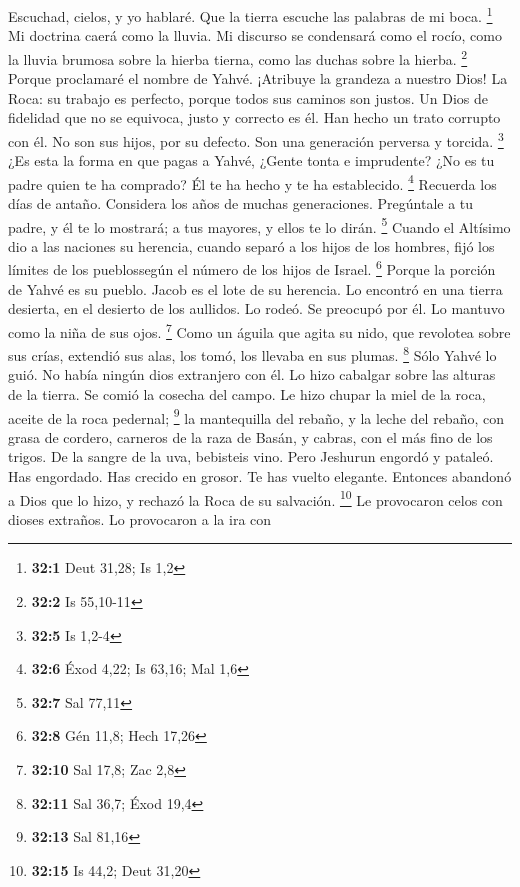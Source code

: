 \begin{paracol}{2}
 Escuchad, cielos, y yo hablaré. Que la tierra escuche las
palabras de mi boca. \footnote{\textbf{32:1} Deut 31,28; Is 1,2}
 Mi doctrina caerá como la lluvia. Mi discurso se
condensará como el rocío, como la lluvia brumosa sobre la hierba tierna,
como las duchas sobre la hierba. \footnote{\textbf{32:2} Is 55,10-11}
 Porque proclamaré el nombre de Yahvé. ¡Atribuye la
grandeza a nuestro Dios!  La Roca: su trabajo es perfecto,
porque todos sus caminos son justos. Un Dios de fidelidad que no se
equivoca, justo y correcto es él.  Han hecho un trato
corrupto con él. No son sus hijos, por su defecto. Son una generación
perversa y torcida. \footnote{\textbf{32:5} Is 1,2-4}  ¿Es
esta la forma en que pagas a Yahvé, ¿Gente tonta e imprudente? ¿No es tu
padre quien te ha comprado? Él te ha hecho y te ha establecido.
\footnote{\textbf{32:6} Éxod 4,22; Is 63,16; Mal 1,6} 
Recuerda los días de antaño. Considera los años de muchas generaciones.
Pregúntale a tu padre, y él te lo mostrará; a tus mayores, y ellos te lo
dirán. \footnote{\textbf{32:7} Sal 77,11}  Cuando el
Altísimo dio a las naciones su herencia, cuando separó a los hijos de
los hombres, fijó los límites de los pueblossegún el número de los hijos
de Israel. \footnote{\textbf{32:8} Gén 11,8; Hech 17,26} 
Porque la porción de Yahvé es su pueblo. Jacob es el lote de su
herencia.  Lo encontró en una tierra desierta, en el
desierto de los aullidos. Lo rodeó. Se preocupó por él. Lo mantuvo como
la niña de sus ojos. \footnote{\textbf{32:10} Sal 17,8; Zac 2,8}
 Como un águila que agita su nido, que revolotea sobre
sus crías, extendió sus alas, los tomó, los llevaba en sus plumas.
\footnote{\textbf{32:11} Sal 36,7; Éxod 19,4}  Sólo Yahvé
lo guió. No había ningún dios extranjero con él.  Lo hizo
cabalgar sobre las alturas de la tierra. Se comió la cosecha del campo.
Le hizo chupar la miel de la roca, aceite de la roca pedernal;
\footnote{\textbf{32:13} Sal 81,16}  la mantequilla del
rebaño, y la leche del rebaño, con grasa de cordero, carneros de la raza
de Basán, y cabras, con el más fino de los trigos. De la sangre de la
uva, bebisteis vino.  Pero Jeshurun engordó y pataleó.
Has engordado. Has crecido en grosor. Te has vuelto elegante. Entonces
abandonó a Dios que lo hizo, y rechazó la Roca de su salvación.
\footnote{\textbf{32:15} Is 44,2; Deut 31,20}  Le
provocaron celos con dioses extraños. Lo provocaron a la ira con

\end{paracol}
